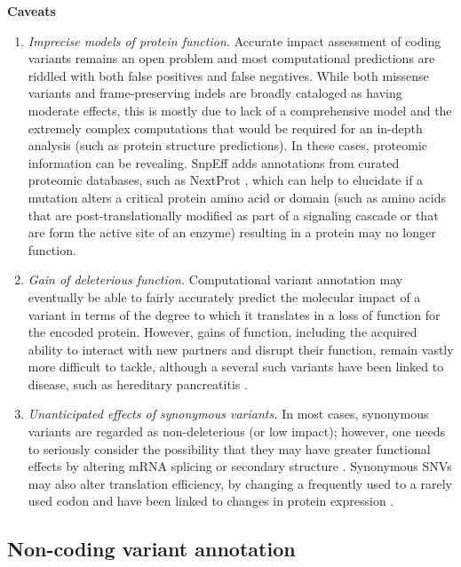 \textbf{Caveats}
	\begin{enumerate}[label=\roman*]
	
	\item \textit{Imprecise models of protein function.} Accurate impact assessment of coding variants remains an open problem and most computational predictions are riddled with both false positives and false negatives. While both missense variants and frame-preserving indels are broadly cataloged as having moderate effects, this is mostly due to lack of a comprehensive model and the extremely complex computations that would be required for an in-depth analysis (such as protein structure predictions). In these cases, proteomic information can be revealing. SnpEff adds annotations from curated proteomic databases, such as NextProt  \cite{lane2012nextprot}, which can help to elucidate if a mutation alters a critical protein amino acid or domain (such as amino acids that are post-translationally modified as part of a signaling cascade or that are form the active site of an enzyme) resulting in a protein may no longer function.
	
	\item \textit{Gain of deleterious function.} Computational variant annotation may eventually be able to fairly accurately predict the molecular impact of a variant in terms of the degree to which it translates in a loss of function for the encoded protein. However, gains of function, including the acquired ability to interact with new partners and disrupt their function, remain vastly more difficult to tackle, although a several such variants have been linked to disease, such as hereditary pancreatitis  \cite{whitcomb1996hereditary}.
	
	\item \textit{Unanticipated effects of synonymous variants.} In most cases, synonymous variants are regarded as non-deleterious (or low impact); however, one needs to seriously consider the possibility that they may have greater functional effects by altering mRNA splicing  \cite{coulombe2009fine} or secondary structure  \cite{sabarinathan2013rnasnp}. Synonymous SNVs may also alter translation efficiency, by changing a frequently used to a rarely used codon and have been linked to changes in protein expression  \cite{sauna2011understanding}.
	
	\end{enumerate}

\subsection{Non-coding variant annotation}

